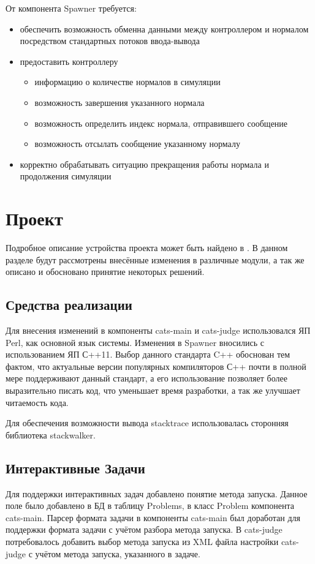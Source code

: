 \documentclass{imcs}
\begin{document}
От компонента Spawner требуется:
\begin{itemize}
\item обеспечить возможность обменна данными между контроллером и нормалом посредством стандартных потоков ввода-вывода
\item предоставить контроллеру
\begin{itemize}
\item информацию о количестве нормалов в симуляции
\item возможность завершения указанного нормала
\item возможность определить индекс нормала, отправившего сообщение
\item возможность отсылать сообщение указанному нормалу
\end{itemize}
\item корректно обрабатывать ситуацию прекращения работы нормала и продолжения симуляции
\end{itemize}

\section{Проект}

Подробное описание устройства проекта может быть найдено в \cite{khrapchenkov}. В данном разделе будут рассмотрены внесённые изменения в различные модули, а так же описано и обосновано принятие некоторых решений.

\subsection{Средства реализации}
Для внесения изменений в компоненты cats-main и cats-judge использовался ЯП Perl, как основной язык системы. Изменения в Spawner вносились с использованием ЯП С++11. Выбор данного стандарта C++ обоснован тем фактом, что актуальные версии популярных компиляторов С++ почти в полной мере поддерживают данный стандарт, а его использование позволяет более выразительно писать код, что уменьшает время разработки, а так же улучшает читаемость кода.

Для обеспечения возможности вывода stacktrace использовалась сторонняя библиотека stackwalker\cite{stackwalker}.

\subsection{Интерактивные Задачи}

Для поддержки интерактивных задач добавлено понятие метода запуска. Данное поле было добавлено в БД в таблицу Problems, в класс Problem компонента cats-main. Парсер формата задачи в компоненты cats-main был доработан для поддержки формата задачи с учётом разбора метода запуска. В cats-judge потребовалось добавить выбор метода запуска из XML файла настройки cats-judge с учётом метода запуска, указанного в задаче.
\end{document}
